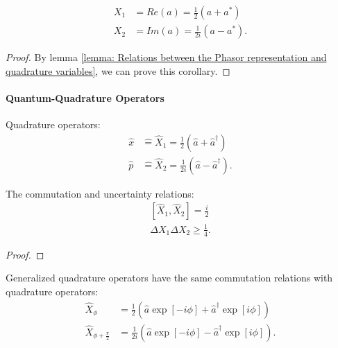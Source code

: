 \documentclass[../../note.tex]{subfiles}
\begin{document}
\begin{corollary}
    \begin{align}
        X_1
        &= Re(a) = \frac{1}{2} \left(a+a^\ast\right) \\
        X_2
        &= Im(a) = \frac{1}{2 i} \left(a - a^\ast\right).
    \end{align}
\end{corollary}
\begin{proof}
    By lemma \ref{lemma: Relations between the Phasor representation and quadrature variables}, we can prove this corollary.
\end{proof}

\paragraph{Quantum-Quadrature Operators}
\begin{definition}
    Quadrature operators:
    \begin{align}
        \hat{x}
        &\hat{=} \hat{X}_1 = \frac{1}{2} \left(\hat{a} + \hat{a}^\dagger \right) \\
        \hat{p}
        &\hat{=} \hat{X}_2 = \frac{1}{2 i} \left(\hat{a} - \hat{a}^\dagger\right).
    \end{align}
\end{definition}

\begin{lemma}
    The commutation and uncertainty relations:
    \begin{align}
        \left[\hat{X}_1, \hat{X}_2\right] = \frac{i}{2} \\
        \Delta X_1 \Delta X_2 \geq \frac{1}{4}.
    \end{align}
\end{lemma}
\begin{proof}
    
\end{proof}

\begin{definition}
    Generalized  quadrature operators have the same commutation relations with quadrature operators:
    \begin{align}
        \hat{X}_{\phi}
        &= \frac{1}{2} \left(\hat{a} \exp\left[-i \phi\right] + \hat{a}^\dagger \exp\left[i \phi\right]\right) \\
        \hat{X}_{\phi + \frac{\pi}{2}}
        &= \frac{1}{2 i} \left(\hat{a} \exp\left[-i \phi\right] - \hat{a}^\dagger \exp\left[i \phi\right]\right).
    \end{align}
\end{definition}
\end{document}
